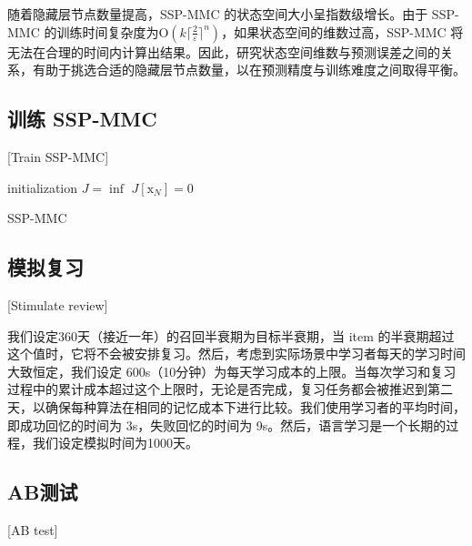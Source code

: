 随着隐藏层节点数量提高，SSP-MMC 的状态空间大小呈指数级增长。由于 SSP-MMC 的训练时间复杂度为$\mathrm O(k\lceil\frac{2}{\varepsilon}\rceil^n)$，如果状态空间的维数过高，SSP-MMC 将无法在合理的时间内计算出结果。因此，研究状态空间维数与预测误差之间的关系，有助于挑选合适的隐藏层节点数量，以在预测精度与训练难度之间取得平衡。

\subsection{训练 SSP-MMC}[Train SSP-MMC]

\begin{algorithm}[htbp]
    initialization\;
    $J = \inf$\;
    $J[\boldsymbol{\mathrm{x}}_{N}] = 0$\;
\caption{SSP-MMC}
\label{alg:ssp_mmc}
\end{algorithm}

\subsection{模拟复习}[Stimulate review]

我们设定360天（接近一年）的召回半衰期为目标半衰期，当 item 的半衰期超过这个值时，它将不会被安排复习。然后，考虑到实际场景中学习者每天的学习时间大致恒定，我们设定 600s（10分钟）为每天学习成本的上限。当每次学习和复习过程中的累计成本超过这个上限时，无论是否完成，复习任务都会被推迟到第二天，以确保每种算法在相同的记忆成本下进行比较。我们使用学习者的平均时间，即成功回忆的时间为 3s，失败回忆的时间为 9s。然后，语言学习是一个长期的过程，我们设定模拟时间为1000天。

\subsection{AB测试}[AB test]

